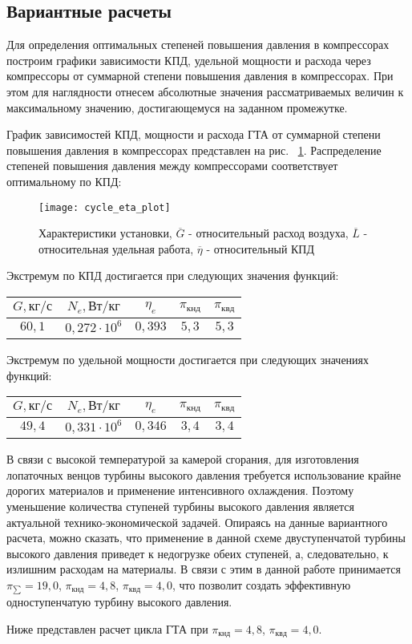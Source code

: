 \subsection{Вариантные расчеты}
Для определения оптимальных степеней повышения давления в компрессорах
построим графики зависимости КПД, удельной мощности и расхода через компрессоры от суммарной степени повышения давления в компрессорах.
При этом для наглядности отнесем абсолютные значения рассматриваемых величин к максимальному значению,
достигающемуся на заданном промежутке.

График зависимостей КПД,
мощности и расхода ГТА от суммарной степени повышения давления в компрессорах представлен на рис. ~\ref{img:cycle_eta_plot}.
Распределение степеней повышения давления между компрессорами соответствует оптимальному по КПД:
\begin{figure}[H]
    \centering
	\texttt{[image: cycle\_eta\_plot]}
	\caption{
		Характеристики установки,
		$\overline{G}$ - относительный расход воздуха,
		$\overline{L}$ - относительная удельная работа,
		$\overline{\eta}$ - относительный КПД
	}
	\label{img:cycle_eta_plot}
\end{figure}

Экстремум по КПД достигается при следующих значения функций:
\begin{center}
	\begin{tabular}{|c|c|c|c|c|}
	\hline
		$G, кг/с$ & $N_e, Вт/кг$ & $\eta_e$ & $\pi_{кнд}$ & $\pi_{квд}$ \\ \hline
		$60,1$ &
		$0,272 \cdot 10^6$ &
		$0,393$ &
		$5,3$ &
		$5,3$ \\ \hline
	\end{tabular}
\end{center}

Экстремум по удельной мощности достигается при следующих значениях функций:
\begin{center}
	\begin{tabular}{|c|c|c|c|c|}
	\hline
		$G, кг/с$ & $N_e, Вт/кг$ & $\eta_e$ & $\pi_{кнд}$ & $\pi_{квд}$ \\ \hline
		$49,4$ &
		$0,331 \cdot 10^6$ &
		$0,346$ &
		$3,4$ &
		$3,4$ \\ \hline
	\end{tabular}
\end{center}

В связи с высокой температурой за камерой сгорания, для изготовления лопаточных венцов турбины высокого давления требуется
использование крайне дорогих материалов и применение интенсивного охлаждения. Поэтому уменьшение количества ступеней
турбины высокого давления является актуальной технико-экономической задачей. Опираясь на данные вариантного расчета,
можно сказать, что применение в данной схеме двуступенчатой турбины высокого давления приведет к недогрузке
обеих ступеней, а, следовательно, к излишним расходам на материалы. В связи с этим в данной работе принимается
$\pi_{\sum} = 19,0$, $\pi_{кнд} = 4,8$, $\pi_{квд} = 4,0$,
что позволит создать эффективную одноступенчатую турбину высокого давления.

Ниже представлен расчет цикла ГТА при $\pi_{кнд} = 4,8$, $\pi_{квд} = 4,0$.